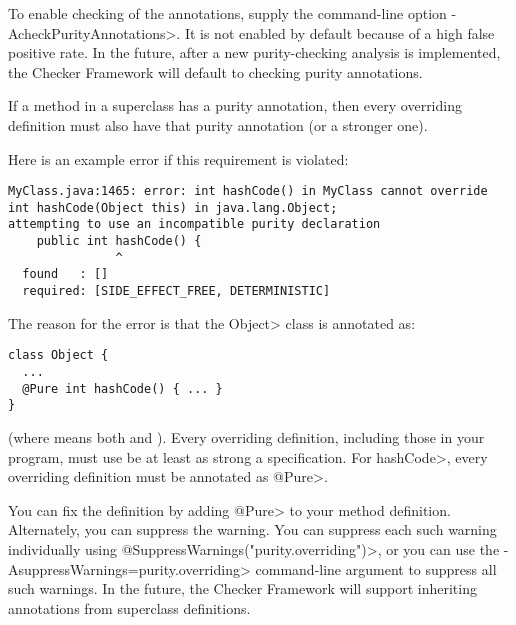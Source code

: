 To enable
checking of the annotations, supply the command-line option
\<-AcheckPurityAnnotations>.  It is not enabled by default because of a high false
positive rate.  In the future, after a new purity-checking analysis is
implemented, the Checker Framework will default to checking purity
annotations.



If a method in a superclass has a purity annotation, then every overriding
definition must also have that purity annotation (or a stronger one).

Here is an example error if this requirement is violated:

\begin{mysmall}
\begin{Verbatim}
MyClass.java:1465: error: int hashCode() in MyClass cannot override int hashCode(Object this) in java.lang.Object;
attempting to use an incompatible purity declaration
    public int hashCode() {
               ^
  found   : []
  required: [SIDE_EFFECT_FREE, DETERMINISTIC]
\end{Verbatim}
\end{mysmall}

\noindent
The reason for the error is that the \<Object> class is annotated as:

\begin{Verbatim}
class Object {
  ...
  @Pure int hashCode() { ... }
}
\end{Verbatim}

\noindent
(where  means both
 and
).  Every overriding
definition, including those in your program, must use be at least as strong
a specification.  For \<hashCode>, every overriding definition must be
annotated as \<@Pure>.

You can fix the definition by adding \<@Pure> to your method definition.
Alternately, you can suppress the warning.
You can suppress each such warning individually using
\<@SuppressWarnings("purity.overriding")>,
or you can use the \<-AsuppressWarnings=purity.overriding>
command-line argument to suppress all such warnings.
In the future, the Checker Framework will support inheriting annotations
from superclass definitions.



